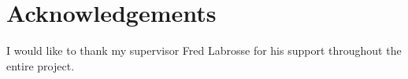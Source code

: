 \thispagestyle{empty}


\section*{\centering Acknowledgements}

I would like to thank my supervisor Fred Labrosse for his support throughout the entire project.


